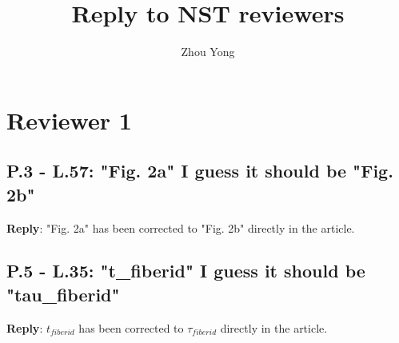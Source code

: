 \documentclass[]{article}
\title{Reply to NST reviewers}
\author{Zhou Yong}
\begin{document}
\maketitle

\section{Reviewer 1}
\subsection{P.3 - L.57: "Fig. 2a" I guess it should be "Fig. 2b"}
\textbf{Reply}:\newline
"Fig. 2a" has been corrected to "Fig. 2b" directly in the article.

\subsection{P.5 - L.35: "t\_fiberid" I guess it should be "tau\_fiberid"}
\textbf{Reply}:\newline
$t_{fiberid}$ has been corrected to $\tau_{fiberid}$ directly in the article.
\end{document}
